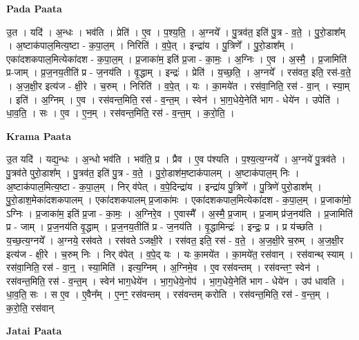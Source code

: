 \documentclass[17pt]{extarticle}
\begin{document}
\textbf{Pada Paata} \newline

उ॒त । यदि॑ । अ॒न्धः । भव॑ति । प्रेति॑ । ए॒व । प॒श्य॒ति॒ । अ॒ग्नये᳚ । पु॒त्रव॑त॒ इति॑ पु॒त्र - व॒ते॒ । पु॒रो॒डाश᳚म् । अ॒ष्टाक॑पाल॒मित्य॒ष्टा - क॒पा॒ल॒म् । निरिति॑ । व॒पे॒त् । इन्द्रा॑य । पु॒त्रिणे᳚ । पु॒रो॒डाश᳚म् । एका॑दशकपाल॒मित्येका॑दश - क॒पा॒ल॒म् । प्र॒जाका॑म॒ इति॑ प्र॒जा - का॒मः॒ । अ॒ग्निः । ए॒व । अ॒स्मै॒ । प्र॒जामिति॑ प्र-जाम् । प्र॒ज॒नय॒तीति॑ प्र - ज॒नय॑ति । वृ॒द्धाम् । इन्द्रः॑ । प्रेति॑ । य॒च्छ॒ति॒ । अ॒ग्नये᳚ । रस॑वत॒ इति॒ रस॑-व॒ते॒ । अ॒ज॒क्षी॒र इत्य॑ज - क्षी॒रे । च॒रुम् । निरिति॑ । व॒पे॒त् । यः । का॒मये॑त । रस॑वा॒निति॒ रस॑ - वा॒न् । स्या॒म् । इति॑ । अ॒ग्निम् । ए॒व । रस॑वन्त॒मिति॒ रस॑ - व॒न्त॒म् । स्वेन॑ । भा॒ग॒धेये॒नेति॑ भाग - धेये॑न । उपेति॑ । धा॒व॒ति॒ । सः । ए॒व । ए॒न॒म् । रस॑वन्त॒मिति॒ रस॑ - व॒न्त॒म् । क॒रो॒ति॒ ।  \newline


\textbf{Krama Paata} \newline

उ॒त यदि॑ । यद्य॒न्धः । अ॒न्धो भव॑ति । भव॑ति॒ प्र । प्रैव । ए॒व प॑श्यति । प॒श्य॒त्य॒ग्नये᳚ । अ॒ग्नये॑ पु॒त्रव॑ते । पु॒त्रव॑ते पुरो॒डाश᳚म् । पु॒त्रव॑त॒ इति॑ पु॒त्र - व॒ते॒ । पु॒रो॒डाश॑म॒ष्टाक॑पालम् । अ॒ष्टाक॑पाल॒म् निः । अ॒ष्टाक॑पाल॒मित्य॒ष्टा - क॒पा॒ल॒म् । निर् व॑पेत् । व॒पे॒दिन्द्रा॑य । इन्द्रा॑य पु॒त्रिणे᳚ । पु॒त्रिणे॑ पुरो॒डाश᳚म् । पु॒रो॒डाश॒मेका॑दशकपालम् । एका॑दशकपालम् प्र॒जाका॑मः । एका॑दशकपाल॒मित्येका॑दश - क॒पा॒ल॒म् । प्र॒जाका॑मो॒ ऽग्निः । प्र॒जाका॑म॒ इति॑ प्र॒जा - का॒मः॒ । अ॒ग्निरे॒व । ए॒वास्मै᳚ । अ॒स्मै॒ प्र॒जाम् । प्र॒जाम् प्र॑ज॒नय॑ति । प्र॒जामिति॑ प्र - जाम् । प्र॒ज॒नय॑ति वृ॒द्धाम् । प्र॒ज॒नय॒तीति॑ प्र - ज॒नय॑ति । वृ॒द्धामिन्द्रः॑ । इन्द्रः॒ प्र । प्र य॑च्छति । य॒च्छ॒त्य॒ग्नये᳚ । अ॒ग्नये॒ रस॑वते । रस॑वते ऽजक्षी॒रे । रस॑वत॒ इति॒ रस॑ - व॒ते॒ । अ॒ज॒क्षी॒रे च॒रुम् । अ॒ज॒क्षी॒र इत्य॑ज - क्षी॒रे । च॒रुम् निः । निर् व॑पेत् । व॒पे॒द् यः । यः का॒मये॑त । का॒मये॑त॒ रस॑वान् । रस॑वान्थ् स्याम् । रस॑वा॒निति॒ रस॑ - वा॒न्॒ । स्या॒मिति॑ । इत्य॒ग्निम् । अ॒ग्निमे॒व । ए॒व रस॑वन्तम् । रस॑वन्तꣳ॒॒ स्वेन॑ । रस॑वन्त॒मिति॒ रस॑ - व॒न्त॒॒म् । स्वेन॑ भाग॒धेये॑न । भा॒ग॒धेये॒नोप॑ । भा॒ग॒धेये॒नेति॑ भाग - धेये॑न । उप॑ धावति । धा॒व॒ति॒ सः । स ए॒व । ए॒वैन᳚म् । ए॒नꣳ॒॒ रस॑वन्तम् । रस॑वन्तम् करोति । रस॑वन्त॒मिति॒ रस॑ - व॒न्त॒म् । क॒रो॒ति॒ रस॑वान् \newline

\textbf{Jatai Paata} \newline
\end{document}
